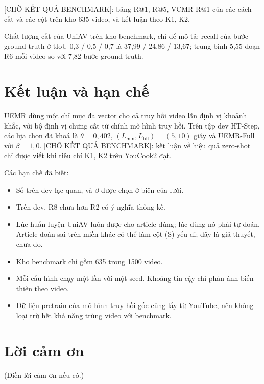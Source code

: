 \documentclass{IEEEtran}
\begin{document}
[CHỜ KẾT QUẢ BENCHMARK]: bảng R@1, R@5, VCMR R@1 của các cách cắt và các cột trên kho 635 video, và kết luận theo K1, K2.

Chất lượng cắt của UniAV trên kho benchmark, chỉ để mô tả: recall của bước ground truth ở tIoU 0,3 / 0,5 / 0,7 là 37,99 / 24,86 / 13,67; trung bình 5,55 đoạn R6 mỗi video so với 7,82 bước ground truth.

\section{Kết luận và hạn chế}
UEMR dùng một chỉ mục đa vector cho cả truy hồi video lẫn định vị khoảnh khắc, với bộ định vị chưng cất từ chính mô hình truy hồi. Trên tập dev HT-Step, các lựa chọn đã khoá là $\theta = 0{,}402$, $(L_{\min}, L_{\mathrm{fill}}) = (5, 10)$ giây và UEMR-Full với $\beta = 1{,}0$. [CHỜ KẾT QUẢ BENCHMARK]: kết luận về hiệu quả zero-shot chỉ được viết khi tiêu chí K1, K2 trên YouCook2 đạt.

Các hạn chế đã biết:
\begin{itemize}
\item Số trên dev lạc quan, và $\beta$ được chọn ở biên của lưới.
\item Trên dev, R8 chưa hơn R2 có ý nghĩa thống kê.
\item Lúc huấn luyện UniAV luôn được cho article đúng; lúc dùng nó phải tự đoán. Article đoán sai trên miền khác có thể làm cột (S) yếu đi; đây là giả thuyết, chưa đo.
\item Kho benchmark chỉ gồm 635 trong 1500 video.
\item Mỗi cấu hình chạy một lần với một seed. Khoảng tin cậy chỉ phản ánh biến thiên theo video.
\item Dữ liệu pretrain của mô hình truy hồi gốc cũng lấy từ YouTube, nên không loại trừ hết khả năng trùng video với benchmark.
\end{itemize}

\section*{Lời cảm ơn}
(Điền lời cảm ơn nếu có.)
\end{document}

